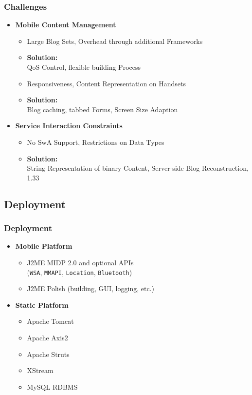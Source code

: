 \documentclass[blue]{beamer}
\begin{document}
\frame
{
\frametitle{\textbf{Challenges}}
\begin{itemize}[<+-|alert@+>]
\item \textbf{Mobile Content Management}
  \begin{itemize}[<+-|alert@+>]
    \item \color[rgb]{1.0,0.0,0.0} Large Blog Sets, Overhead through additional Frameworks
    \item \color[rgb]{0.0,0.7,0.0} \textbf{Solution:}\\QoS Control, flexible building Process  
    \item \color[rgb]{1.0,0.0,0.0} Responsiveness, Content Representation on Handsets
    \item \color[rgb]{0.0,0.7,0.0} \textbf{Solution:}\\Blog caching, tabbed Forms, Screen Size Adaption
  \end{itemize}
\item \textbf{Service Interaction Constraints}
  \begin{itemize}[<+-|alert@+>]
    \item \color[rgb]{1.0,0.0,0.0} No SwA Support, Restrictions on Data Types
    \item \color[rgb]{0.0,0.7,0.0} \textbf{Solution:}\\String Representation of binary Content, Server-side Blog Reconstruction, 1.33
  \end{itemize}
\end{itemize}
}

\subsection{Deployment}
\frame
{
\frametitle{\textbf{Deployment}}
\begin{itemize}
\item \textbf{Mobile Platform}
  \begin{itemize}
    \item J2ME MIDP 2.0 and optional APIs\\(\texttt{WSA}, \texttt{MMAPI}, \texttt{Location}, \texttt{Bluetooth})
    \item J2ME Polish (building, GUI, logging, etc.)
  \end{itemize}
\item \textbf{Static Platform}
  \begin{itemize}
    \item Apache Tomcat
    \item Apache Axis2
    \item Apache Struts
    \item XStream
    \item MySQL RDBMS
  \end{itemize}
\end{itemize}
}
\end{document}
